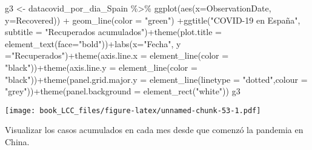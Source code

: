\documentclass[
]{book}
\newenvironment{Shaded}{\begin{snugshade}}{\end{snugshade}}
\newcommand{\AttributeTok}[1]{\textcolor[rgb]{0.77,0.63,0.00}{#1}}
\newcommand{\FunctionTok}[1]{\textcolor[rgb]{0.00,0.00,0.00}{#1}}
\newcommand{\NormalTok}[1]{#1}
\newcommand{\OtherTok}[1]{\textcolor[rgb]{0.56,0.35,0.01}{#1}}
\newcommand{\SpecialCharTok}[1]{\textcolor[rgb]{0.00,0.00,0.00}{#1}}
\newcommand{\StringTok}[1]{\textcolor[rgb]{0.31,0.60,0.02}{#1}}
\begin{document}
\begin{Shaded}
\begin{Highlighting}[]
\NormalTok{g3 }\OtherTok{\textless{}{-}}\NormalTok{ datacovid\_por\_dia\_Spain }\SpecialCharTok{\%\textgreater{}\%}
    \FunctionTok{ggplot}\NormalTok{(}\FunctionTok{aes}\NormalTok{(}\AttributeTok{x=}\NormalTok{ObservationDate, }\AttributeTok{y=}\NormalTok{Recovered)) }\SpecialCharTok{+}  \FunctionTok{geom\_line}\NormalTok{(}\AttributeTok{color =} \StringTok{"green"}\NormalTok{) }\SpecialCharTok{+}\FunctionTok{ggtitle}\NormalTok{(}\StringTok{"COVID{-}19 en España"}\NormalTok{, }\AttributeTok{subtitle =} \StringTok{"Recuperados acumulados"}\NormalTok{)}\SpecialCharTok{+}\FunctionTok{theme}\NormalTok{(}\AttributeTok{plot.title =} \FunctionTok{element\_text}\NormalTok{(}\AttributeTok{face=}\StringTok{"bold"}\NormalTok{))}\SpecialCharTok{+}\FunctionTok{labs}\NormalTok{(}\AttributeTok{x=}\StringTok{"Fecha"}\NormalTok{, }\AttributeTok{y =}\StringTok{"Recuperados"}\NormalTok{)}\SpecialCharTok{+}\FunctionTok{theme}\NormalTok{(}\AttributeTok{axis.line.x =} \FunctionTok{element\_line}\NormalTok{(}\AttributeTok{color =} \StringTok{"black"}\NormalTok{))}\SpecialCharTok{+}\FunctionTok{theme}\NormalTok{(}\AttributeTok{axis.line.y =} \FunctionTok{element\_line}\NormalTok{(}\AttributeTok{color =} \StringTok{"black"}\NormalTok{))}\SpecialCharTok{+}\FunctionTok{theme}\NormalTok{(}\AttributeTok{panel.grid.major.y =} \FunctionTok{element\_line}\NormalTok{(}\AttributeTok{linetype =} \StringTok{"dotted"}\NormalTok{,}\AttributeTok{colour =} \StringTok{"grey"}\NormalTok{))}\SpecialCharTok{+}\FunctionTok{theme}\NormalTok{(}\AttributeTok{panel.background =} \FunctionTok{element\_rect}\NormalTok{(}\StringTok{"white"}\NormalTok{))}
\NormalTok{g3}
\end{Highlighting}
\end{Shaded}

\texttt{[image: book\_LCC\_files/figure-latex/unnamed-chunk-53-1.pdf]}

Visualizar los casos acumulados en cada mes desde que comenzó la pandemia en China.
\end{document}

